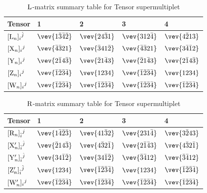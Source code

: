 \documentclass[12pt]{article}
\def\rL{{\rm L}}
\def\rR{{\rm R}}
\let\bm\relax
\newcommand{\bm}[1]{{\boldsymbol{#1}}}
\begin{document}
\begin{table}[H]
\setlength\extrarowheight{2pt}
\begin{center}
\begin{tabular}{|m{2.8em}|m{3.4cm}|m{3.1cm}|m{3.1cm}|m{3.2cm}|}
\hline
Tensor &  1&  2& 3& 4\\ 
\hline
$[{\bm \rL}_n]_{i}{}^{\hat j}$ & 
$\vev{1\bar3\bar4\bar2}$& 
$\vev{24\bar31}$& 
$\vev{312\bar4}$& 
$\vev{4\bar213}$\\   
\hline
$[{\bm{\rm X}}_n]_{i}{}^{j}$&  
$\vev{\bar4\bar321}$&
$\vev{\bar341\bar2}$&
$\vev{\bar4\bar321}$& 
$\vev{3\bar4\bar12}$\\ 
\hline
$[{\bm{\rm Y}}_n]_{i}{}^{j}$
&  
$\vev{2\bar14\bar3}$&  
$\vev{\bar21\bar43}$&  
$\vev{\bar21\bar43}$& 
$\vev{2\bar14\bar3}$\\ 
\hline
$[{\bm{\rm Z}}_n]_{i}{}^{j}$ &  
$\vev{\bar1\bar2\bar3\bar4}$&  
$\vev{1234}$&  
$\vev{\bar1\bar2\bar3\bar4}$&
$\vev{1234}$\\ 
\hline
$[{\bm{\rm W}}_n]_{i}{}^{j}$ &  
$\vev{\bar1\bar2\bar3\bar4}$&  
$\vev{\bar1\bar2\bar3\bar4}$&  
$\vev{\bar1\bar2\bar3\bar4}$&
$\vev{\bar1\bar2\bar3\bar4}$\\ 
\hline
\end{tabular}
\end{center}
\caption{$\bm\rL$-matrix summary table for Tensor supermultiplet}
\label{tab5a}
\end{table}

\begin{table}[H]
\setlength\extrarowheight{2pt}
\begin{center}
\begin{tabular}{|m{2.8em}|m{3.4cm}|m{3.1cm}|m{3.1cm}|m{3.2cm}|}
\hline
Tensor &  1&  2& 3& 4\\ 
\hline
$[{\bm{\rm R}}_n]_{\hat i}{}^{j}$ & 
$\vev{1\bar4\bar2\bar3}$& 
$\vev{41\bar32}$& 
$\vev{231\bar4}$& 
$\vev{3\bar243}$\\   
\hline
$[{\bm{\rm X}}'_n]_{\hat i}{}^{\hat j}$ &  
$\vev{\bar214\bar3}$&  
$\vev{4\bar32\bar1}$&  
$\vev{2\bar1\bar43}$& 
$\vev{4\bar32\bar1}$\\ 
\hline
$[{\bm{\rm Y}}'_n]_{\hat i}{}^{\hat j}$ &  
$\vev{34\bar1\bar2}$&  
$\vev{34\bar1\bar2}$&  
$\vev{\bar3\bar412}$& 
$\vev{\bar3\bar412}$\\ 
\hline
$[{\bm{\rm Z}}'_n]_{\hat i}{}^{\hat j}$ &  
$\vev{1234}$&  
$\vev{\bar1\bar2\bar3\bar4}$&  
$\vev{1234}$&
$\vev{\bar1\bar2\bar3\bar4}$\\ 
\hline
$[{\bm{\rm W}}'_n]_{i}{}^{j}$ &  
$\vev{\bar1\bar2\bar3\bar4}$&  
$\vev{\bar1\bar2\bar3\bar4}$&  
$\vev{\bar1\bar2\bar3\bar4}$&
$\vev{\bar1\bar2\bar3\bar4}$\\ 
\hline
\end{tabular}
\end{center}
\caption{$\bm\rR$-matrix summary table for Tensor supermultiplet}
\label{tab6a}
\end{table}
\end{document}
